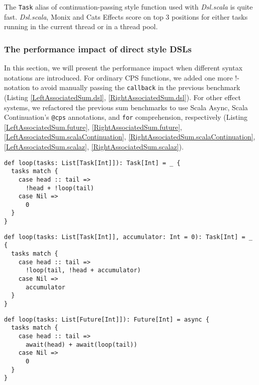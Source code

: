The \lstinline{Task} alias of continuation-passing style function used with \textit{Dsl.scala} is quite fast. \textit{Dsl.scala}, Monix and Cats Effects score on top 3 positions for either tasks running in the current thread or in a thread pool.

\subsubsection{The performance impact of direct style DSLs}

In this section, we will present the performance impact when different syntax notations are introduced. For ordinary CPS functions, we added one more !-notation to avoid manually passing the \lstinline{callback} in the previous benchmark (Listing \ref{LeftAssociatedSum.dsl}, \ref{RightAssociatedSum.dsl}). For other effect systems, we refactored the previous sum benchmarks to use Scala Async, Scala Continuation's \lstinline{@cps} annotations, and \lstinline{for} comprehension, respectively (Listing \ref{LeftAssociatedSum.future}, \ref{RightAssociatedSum.future}, \ref{LeftAssociatedSum.scalaContinuation}, \ref{RightAssociatedSum.scalaContinuation}, \ref{LeftAssociatedSum.scalaz}, \ref{RightAssociatedSum.scalaz}).

\begin{lstlisting}[float=htbp,caption={Left-associated sum based on LDKs of \textit{Dsl.scala}},label={LeftAssociatedSum.dsl}]
def loop(tasks: List[Task[Int]]): Task[Int] = _ {
  tasks match {
    case head :: tail =>
      !head + !loop(tail)
    case Nil =>
      0
  }
}
\end{lstlisting}

\begin{lstlisting}[float=htbp,caption={Right-associated sum based on LDKs of \textit{Dsl.scala}},label={RightAssociatedSum.dsl}]
def loop(tasks: List[Task[Int]], accumulator: Int = 0): Task[Int] = _ {
  tasks match {
    case head :: tail =>
      !loop(tail, !head + accumulator)
    case Nil =>
      accumulator
  }
}
\end{lstlisting}

\begin{lstlisting}[float=htbp,caption={Left-associated sum based on Scala Async},label={LeftAssociatedSum.future}]
def loop(tasks: List[Future[Int]]): Future[Int] = async {
  tasks match {
    case head :: tail =>
      await(head) + await(loop(tail))
    case Nil =>
      0
  }
}
\end{lstlisting}

